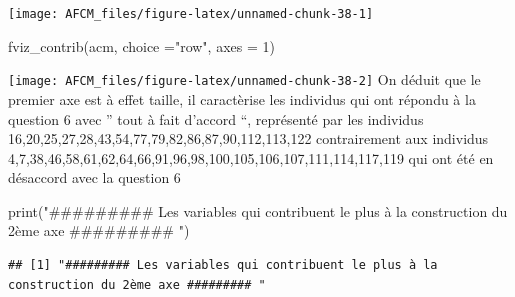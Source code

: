 \documentclass[
]{article}
\newenvironment{Shaded}{\begin{snugshade}}{\end{snugshade}}
\newcommand{\AttributeTok}[1]{\textcolor[rgb]{0.77,0.63,0.00}{#1}}
\newcommand{\DecValTok}[1]{\textcolor[rgb]{0.00,0.00,0.81}{#1}}
\newcommand{\FunctionTok}[1]{\textcolor[rgb]{0.00,0.00,0.00}{#1}}
\newcommand{\NormalTok}[1]{#1}
\newcommand{\StringTok}[1]{\textcolor[rgb]{0.31,0.60,0.02}{#1}}
\begin{document}
\texttt{[image: AFCM\_files/figure-latex/unnamed-chunk-38-1]}

\begin{Shaded}
\begin{Highlighting}[]
\FunctionTok{fviz\_contrib}\NormalTok{(acm, }\AttributeTok{choice =}\StringTok{"row"}\NormalTok{, }\AttributeTok{axes =} \DecValTok{1}\NormalTok{)}
\end{Highlighting}
\end{Shaded}

\texttt{[image: AFCM\_files/figure-latex/unnamed-chunk-38-2]}
On déduit que le premier axe est à effet taille, il caractèrise les
individus qui ont répondu à la question 6 avec '' tout à fait d'accord
``, représenté par les individus
16,20,25,27,28,43,54,77,79,82,86,87,90,112,113,122 contrairement aux
individus
4,7,38,46,58,61,62,64,66,91,96,98,100,105,106,107,111,114,117,119 qui
ont été en désaccord avec la question 6

\begin{Shaded}
\begin{Highlighting}[]
\FunctionTok{print}\NormalTok{(}\StringTok{"\#\#\#\#\#\#\#\#\# Les variables qui contribuent le plus à la construction du 2ème axe \#\#\#\#\#\#\#\#\# "}\NormalTok{)}
\end{Highlighting}
\end{Shaded}

\begin{verbatim}
## [1] "######### Les variables qui contribuent le plus à la construction du 2ème axe ######### "
\end{verbatim}
\end{document}
